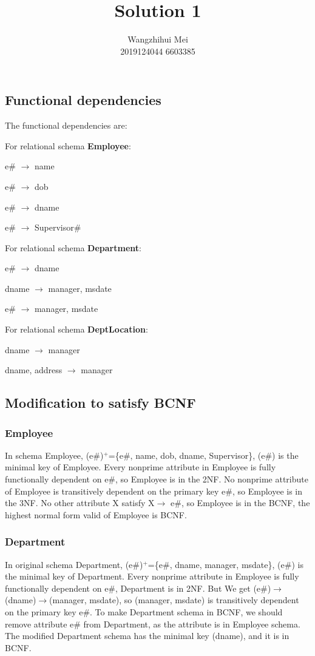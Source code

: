 \documentclass[12pt]{article}%
\begin{document}
\title{Solution 1}
\author{Wangzhihui Mei \\ 2019124044 6603385}
\date{}
\maketitle

\subsection*{Functional dependencies}
The functional dependencies are:

\noindent For relational schema \textbf{Employee}:

e\# $\rightarrow$ name 

e\# $\rightarrow$ dob

e\# $\rightarrow$ dname

e\# $\rightarrow$ Supervisor\#

\noindent For relational schema \textbf{Department}:

e\# $\rightarrow$ dname

dname $\rightarrow$ manager, msdate

e\# $\rightarrow$ manager, msdate

\noindent For relational schema \textbf{DeptLocation}:

dname $\rightarrow$ manager

dname, address $\rightarrow$ manager

\subsection*{Modification to satisfy BCNF}
\subsubsection*{Employee}
\noindent In schema Employee, (e\#)$^+$=\{e\#, name, dob, dname, Supervisor\}, (e\#) is the minimal key of Employee. 
Every nonprime attribute in Employee is fully functionally dependent on e\#, so Employee is in the 2NF.
No nonprime attribute of Employee is transitively dependent on the primary key e\#, so Employee is in the 3NF.
No other attribute X satisfy X$\rightarrow$ e\#, so Employee is in the BCNF, the highest normal form valid of Employee is BCNF.

\subsubsection*{Department}
\noindent In original schema Department, (e\#)$^+$=\{e\#, dname, manager, msdate\}, (e\#) is the minimal key of Department. Every nonprime attribute in Employee is fully functionally dependent on e\#, Department is in 2NF. 
But We get (e\#)$\rightarrow$(dname)$\rightarrow$(manager, msdate), so (manager, msdate) is transitively dependent on the primary key e\#. To make Department schema in BCNF, we should remove attribute e\# from Department, as the attribute is in Employee schema. The modified Department schema has the minimal key (dname), and it is in BCNF.
\end{document}
